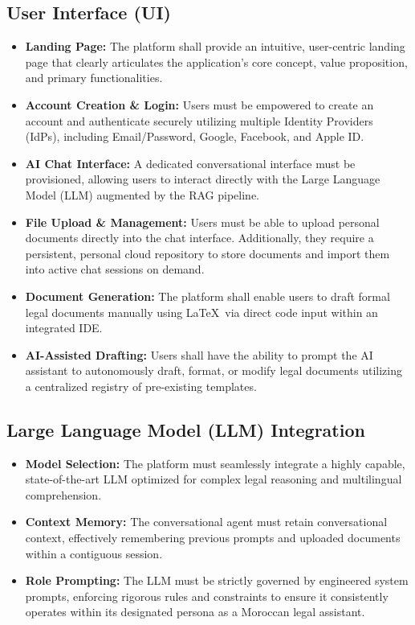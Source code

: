 \subsection{User Interface (UI)}
\begin{itemize}
    \item \textbf{Landing Page:} The platform shall provide an intuitive, user-centric landing page that clearly articulates the application's core concept, value proposition, and primary functionalities.
    \item \textbf{Account Creation \& Login:} Users must be empowered to create an account and authenticate securely utilizing multiple Identity Providers (IdPs), including Email/Password, Google, Facebook, and Apple ID.
    \item \textbf{AI Chat Interface:} A dedicated conversational interface must be provisioned, allowing users to interact directly with the Large Language Model (LLM) augmented by the RAG pipeline.
    \item \textbf{File Upload \& Management:} Users must be able to upload personal documents directly into the chat interface. Additionally, they require a persistent, personal cloud repository to store documents and import them into active chat sessions on demand.
    \item \textbf{Document Generation:} The platform shall enable users to draft formal legal documents manually using \LaTeX\ via direct code input within an integrated IDE.
    \item \textbf{AI-Assisted Drafting:} Users shall have the ability to prompt the AI assistant to autonomously draft, format, or modify legal documents utilizing a centralized registry of pre-existing templates.
\end{itemize}

\subsection{Large Language Model (LLM) Integration}
\begin{itemize}
    \item \textbf{Model Selection:} The platform must seamlessly integrate a highly capable, state-of-the-art LLM optimized for complex legal reasoning and multilingual comprehension.
    \item \textbf{Context Memory:} The conversational agent must retain conversational context, effectively remembering previous prompts and uploaded documents within a contiguous session.
    \item \textbf{Role Prompting:} The LLM must be strictly governed by engineered system prompts, enforcing rigorous rules and constraints to ensure it consistently operates within its designated persona as a Moroccan legal assistant.
\end{itemize}

